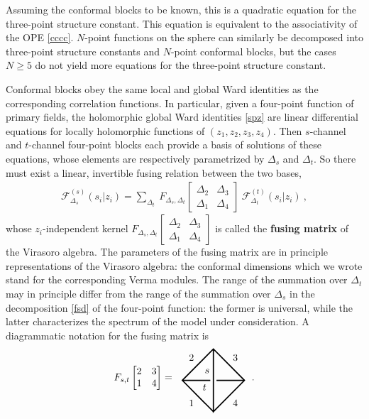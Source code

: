 \documentclass[12pt,a4paper,notitlepage]{report}
\numberwithin{equation}{section}
\theoremstyle{break}
\begin{document}
Assuming the conformal blocks to be known, this is a quadratic equation for the three-point structure constant.
This equation is equivalent to the associativity of the OPE \eqref{cccc}. $N$-point functions on the sphere can similarly be decomposed into three-point structure constants and $N$-point conformal blocks, but the cases $N\geq 5$ do not yield more equations for the three-point structure constant. 

Conformal blocks obey the same local and global Ward identities as the corresponding correlation functions.
In particular, given a four-point function of primary fields, the holomorphic global Ward identities \eqref{spz} are linear differential equations for locally holomorphic functions of $(z_1,z_2,z_3,z_4)$.
Then
$s$-channel and $t$-channel four-point blocks each provide a basis of solutions of these equations, whose elements are respectively parametrized by $\Delta_s$ and $\Delta_t$.
So there must exist a linear, invertible fusing relation between the two bases, 
\begin{align}
 \mathcal{F}^{(s)}_{\Delta_s}(s_i|z_i) = \sum_{\Delta_t}\ F_{\Delta_s,\Delta_t}\begin{bmatrix} \Delta_2 & \Delta_3 \\ \Delta_1 & \Delta_4 \end{bmatrix}\ \mathcal{F}^{(t)}_{\Delta_t}(s_i|z_i)\ ,
\end{align}
whose $z_i$-independent kernel $F_{\Delta_s,\Delta_t}\begin{bmatrix} \Delta_2 & \Delta_3 \\ \Delta_1 & \Delta_4 \end{bmatrix}$ is called the \textbf{\boldmath fusing matrix} of the Virasoro algebra.
The parameters of the fusing matrix are in principle representations of the Virasoro algebra: the conformal dimensions which we wrote stand for the corresponding Verma modules.
The range of the summation over $\Delta_t$ may in principle differ from the range of the summation over $\Delta_s$ in the decomposition \eqref{fsd} of the four-point function: the former is universal, while the latter characterizes the spectrum of the model under consideration.
A diagrammatic notation for the fusing matrix is 
\begin{align}
 F_{s,t}\begin{bmatrix} 2 & 3 \\ 1 & 4 \end{bmatrix} = \ \ 
\begin{tikzpicture}[baseline=(current  bounding  box.center), very thick, scale = .55]
\draw (0, -2) -- node [below left] {$1$} (-2, 0) -- node [above left] {$2$} (0, 2) -- node [above right] {$3$} (2, 0) -- node [below right] {$4$} (0, -2) -- (0, 2);
\draw (-2, 0) -- (-.2, 0) node [below left] {$t$}; \draw (.2, 0) -- (2, 0);
\node [above left] at (0, .2) {$s$};
\end{tikzpicture}
\ \ .
\end{align}
\end{document}
